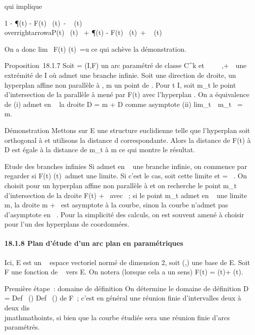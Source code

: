 \documentclass[]{article}
\begin{document}
qui implique

1 - \P(t) - F(t)\
\over
\F(t)\ -
\a\
\over
\F(t)\ \leq
\\overrightarrowaP(t)\
\over
\F(t)\  +
\P(t) - F(t)\
\over
\F(t)\ +
\a\
\over
\F(t)\

On a donc lim~ F(t) \over
\F(t)\
=\vec u ce qui achève la démonstration.

Proposition~18.1.7 Soit \Gamma = (I,F) un arc paramétré de classe
C^k et \alpha~ \in {}~ \cup\-\infty~,+\infty~\ une
extrémité de I où \Gamma admet une branche infinie. Soit
\vecD une direction de droite, \Pi un hyperplan affine
non parallèle à \vecD, m un point de \Pi. Pour t \in I,
soit m_t le point d'intersection de la parallèle à
\vecD mené par F(t) avec l'hyperplan \Pi. On a
équivalence de (i) \Gamma admet en \alpha~ la droite D = m +\vec
D comme asymptote (ii)
lim_t\rightarrow~\alpha~m_t~ = m.

Démonstration Mettons sur E une structure euclidienne telle que
l'hyperplan \Pi soit orthogonal à \vecD et utilisons la
distance d correspondante. Alors la distance de F(t) à D est égale à la
distance de m_t à m ce qui montre le résultat.

Etude des branches infinies Si \Gamma admet en \alpha~ une branche infinie, on
commence par regarder si  F(t) \over
\F(t)\ admet une
limite. Si c'est le cas, soit \vecu cette limite et
\vecD = \mathbb{R}~\vecu. On choisit pour \Pi
un hyperplan affine non parallèle à \vecD et on
recherche le point m_t d'intersection de la droite F(t) +
\mathbb{R}~\vecu avec \Pi~; si le point m_t admet en \alpha~
une limite m, la droite m + ~\vecu est asymptote à la
courbe, sinon la courbe n'admet pas d'asymptote en \alpha~. Pour la simplicité
des calculs, on est souvent amené à choisir pour \Pi l'un des hyperplans
de coordonnées.

\paragraph{18.1.8 Plan d'étude d'un arc plan en paramétriques}

Ici, E est un ~ espace vectoriel normé de dimension 2, soit
(\vec\imath,\vecȷ) une base de E. Soit
F une fonction de \mathbb{R}~ vers E. On notera (lorsque cela a un sens) F(t) =
\phi(t)\vec\imath + \psi(t).

Première étape~: domaine de définition On détermine le domaine de
définition D = Def~ (\phi)
\bigcap Def~ (\psi) de F~; c'est en général une réunion
finie d'intervalles deux à deux dis\\jmathmathoints, si bien que la courbe étudiée
sera une réunion finie d'arcs paramétrés.
\end{document}
